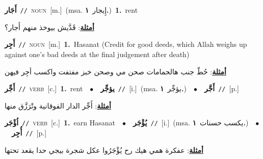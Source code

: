 \documentclass[10pt,a4paper,twoside]{article} %
\begin{document}
\begin{multicols}{2}
{{{{{\setlength\topsep{0pt}\textbf{\foreignlanguage{arabic}{أَجَار}}\ {\color{gray}\texttt{//}\color{black}}\ \textsc{noun}\ [m.]\ \color{gray}(msa. \foreignlanguage{arabic}{إِيجار}~\foreignlanguage{arabic}{\textbf{١.}})\color{black}\ \textbf{1.}~rent\  \begin{flushright}\color{gray}\foreignlanguage{arabic}{\textbf{\underline{\foreignlanguage{arabic}{أمثلة}}}: قَدَّيش بيوخذ منهم أَجار؟}\end{flushright}\color{black}} \vspace{2mm}

{\setlength\topsep{0pt}\textbf{\foreignlanguage{arabic}{أَجِر}}\ {\color{gray}\texttt{//}\color{black}}\ \textsc{noun}\ [m.]\ \textbf{1.}~Hasanat (Credit for good deeds, which Allah weighs up against one's bad deeds at the final judgement after death)\  \begin{flushright}\color{gray}\foreignlanguage{arabic}{\textbf{\underline{\foreignlanguage{arabic}{أمثلة}}}: حُطّ جنب هالحمامات صحن مي وصحن خبز مفتفت واكسب أجِر فيهن}\end{flushright}\color{black}} \vspace{2mm}

{\setlength\topsep{0pt}\textbf{\foreignlanguage{arabic}{أَجِّر}}\ {\color{gray}\texttt{//}\color{black}}\ \textsc{verb}\ [c.]\ \textbf{1.}~rent\ \ $\bullet$\ \ \setlength\topsep{0pt}\textbf{\foreignlanguage{arabic}{يؤجِّر}}\ {\color{gray}\texttt{//}\color{black}}\ [i.]\ \color{gray}(msa. \foreignlanguage{arabic}{يؤجِّر}~\foreignlanguage{arabic}{\textbf{١.}})\color{black}\ \ $\bullet$\ \ \setlength\topsep{0pt}\textbf{\foreignlanguage{arabic}{أَجَّر}}\ {\color{gray}\texttt{//}\color{black}}\ [p.]\  \begin{flushright}\color{gray}\foreignlanguage{arabic}{\textbf{\underline{\foreignlanguage{arabic}{أمثلة}}}: أَجِّر الدار الفوقانية وتْرَزَّق منها}\end{flushright}\color{black}} \vspace{2mm}

{\setlength\topsep{0pt}\textbf{\foreignlanguage{arabic}{اُؤْجَر}}\ {\color{gray}\texttt{//}\color{black}}\ \textsc{verb}\ [c.]\ \textbf{1.}~earn Hasanat\ \ $\bullet$\ \ \setlength\topsep{0pt}\textbf{\foreignlanguage{arabic}{يُؤْجَر}}\ {\color{gray}\texttt{//}\color{black}}\ [i.]\ \color{gray}(msa. \foreignlanguage{arabic}{يكسب حسنات}~\foreignlanguage{arabic}{\textbf{١.}})\color{black}\ \ $\bullet$\ \ \setlength\topsep{0pt}\textbf{\foreignlanguage{arabic}{أُجِر}}\ {\color{gray}\texttt{//}\color{black}}\ [p.]\  \begin{flushright}\color{gray}\foreignlanguage{arabic}{\textbf{\underline{\foreignlanguage{arabic}{أمثلة}}}: عفكرة همي هيك رح يُؤْجَرُوا عكل شجرة بيجي حدا يقعد تحتها}\end{flushright}\color{black}} \vspace{2mm}

}}}}
\end{multicols}
\end{document}
